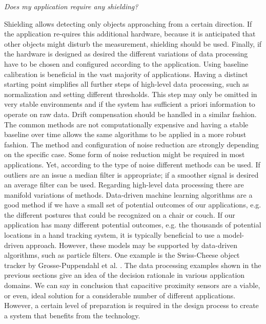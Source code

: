 \textit{Does my application require any shielding?}


Shielding allows detecting only objects approaching from a certain direction. If the application re-quires this additional hardware, because it is anticipated that other objects might disturb the measurement, shielding should be used.
Finally, if the hardware is designed as desired the different variations of data processing have to be chosen and configured according to the application.
Using baseline calibration is beneficial in the vast majority of applications. Having a distinct starting point simplifies all further steps of high-level data processing, such as normalization and setting different thresholds. This step may only be omitted in very stable environments and if the system has sufficient a priori information to operate on raw data. Drift compensation should be handled in a similar fashion. The common methods are not computationally expensive and having a stable baseline over time allows the same algorithms to be applied in a more robust fashion. The method and configuration of noise reduction are strongly depending on the specific case. Some form of noise reduction might be required in most applications. Yet, according to the type of noise different methods can be used. If outliers are an issue a median filter is appropriate; if a smoother signal is desired an average filter can be used. 
Regarding high-level data processing there are manifold variations of methods. Data-driven machine learning algorithms are a good method if we have a small set of potential outcomes of our applications, e.g. the different postures that could be recognized on a chair or couch. If our application has many different potential outcomes, e.g. the thousands of potential locations in a hand tracking system, it is typically beneficial to use a model-driven approach. However, these models may be supported by data-driven algorithms, such as particle filters. One example is the Swiss-Cheese object tracker by Grosse-Puppendahl et al. \cite{grosse2013swiss}. The data processing examples shown in the previous sections give an idea of the decision rationale in various application domains.
We can say in conclusion that capacitive proximity sensors are a viable, or even, ideal solution for a considerable number of different applications. However, a certain level of preparation is required in the design process to create a system that benefits from the technology.
